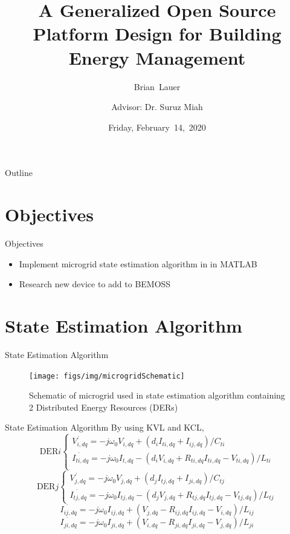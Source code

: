 \documentclass{beamer}
\title[]{A Generalized Open Source Platform Design for Building Energy Management}
\author[B.~Lauer]{Brian~Lauer\\\and
Advisor: Dr. Suruz Miah}
\institute[Bradley University] %
{
  Department of Electrical and Computer Engineering\\
  Bradley University\\
  1501 W. Bradley Avenue\\
  Peoria, IL, 61625, USA
}
\date[February~14,~2020]{Friday, February~14,~2020}
\begin{document}
\begin{frame}
  \titlepage
\end{frame}

\begin{frame}{Outline}
  \tableofcontents
\end{frame}

\section{Objectives}

\begin{frame}{Objectives}{}
\begin{itemize}
\item Implement microgrid state estimation algorithm in \cite{rana2018} in MATLAB
\item Research new device to add to BEMOSS
\end{itemize}
\end{frame}

\section{State Estimation Algorithm}
\begin{frame}{State Estimation Algorithm}{}
\begin{figure}
\texttt{[image: figs/img/microgridSchematic]}
\caption{Schematic of microgrid used in state estimation algorithm containing 2 Distributed Energy Resources (DERs)}
\end{figure}
\end{frame}

\begin{frame}{State Estimation Algorithm}{}
By using KVL and KCL,
\[
\text{DER}i
\begin{cases}
\dot{V_{i,dq}}=-j \omega_0 V_{i,dq} + (d_i I_{ti,dq}+I_{ij,dq})/C_{ti}\\
\dot{I_{ti,dq}}=-j \omega_0 I_{t,dq} - (d_i V_{i,dq}+R_{ti,dq} I_{ti,dq} - V_{ti,dq})/L_{ti}\\
\end{cases}
\]
\[
\text{DER}j
\begin{cases}
\dot{V_{j,dq}}=-j \omega_0 V_{j,dq} + (d_j I_{tj,dq}+I_{ji,dq})/C_{tj}\\
\dot{I_{tj,dq}}=-j \omega_0 I_{tj,dq} -(d_j V_{j,dq} + R_{tj, dq} I_{tj,dq} - V_{tj,dq})/L_{tj}
\end{cases}
\]
\[
\dot{I_{ij,dq}}=-j \omega_0 I_{ij,dq} + (V_{j,dq} - R_{ij,dq} I_{ij,dq} - V_{i,dq})/L_{ij}
\]
\[
\dot{I_{ji,dq}}=-j \omega_0 I_{ji,dq} + (V_{i,dq} - R_{ji,dq} I_{ji,dq} - V_{j,dq})/L_{ji}
\]
\end{frame}
\end{document}
